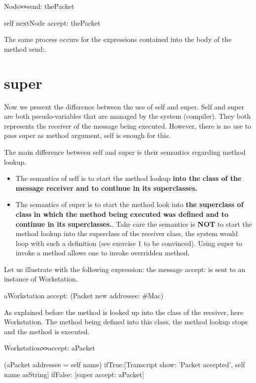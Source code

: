 \begin{code}
 Node\texttt{>}\texttt{>}send: thePacket

      self nextNode accept: thePacket
\end{code}

The same process occurs for the expressions contained into the 
body of the method send:. 



\section{super}


Now we present the difference between the use of self and super. 
Self and super are both pseudo-variables that are managed by 
the system (compiler). They both represents the receiver of the 
message being executed. However, there is no use to pass super 
as method argument, self is enough for this.

The main difference between self and super is their semantics 
regarding method lookup. 

\begin{itemize}
\item
The semantics of self is to start the method lookup \textbf{into 
the class of the message receiver and to continue in its superclasses.}\\
\item
The semantics of super is to start the method look into \textbf{the 
superclass of class} \textbf{in which the method being executed was 
defined and to continue in its superclasses.}. Take care the semantics 
is \textbf{NOT} to start the method lookup into the superclass of 
the receiver class, the system would loop with such a definition 
(see exercise 1 to be convinced). Using super to invoke a method 
allows one to invoke overridden method.
\end{itemize}

Let us illustrate with the following expression: the message accept: 
is sent to an instance of Workstation. 

\begin{code}
aWorkstation accept: (Packet new addressee: \#Mac)
\end{code}

As explained before the method is looked up into the class of 
the receiver, here Workstation. The method being defined into 
this class, the method lookup stops and the method is executed. 

\begin{code}
 Workstation\texttt{>>}accept: aPacket

     (aPacket addressee = self name)
         ifTrue:\ensuremath{[}Transcript show: 'Packet accepted', self name asString\ensuremath{]}
         ifFalse: \ensuremath{[}super accept: aPacket\ensuremath{]}
\end{code}

